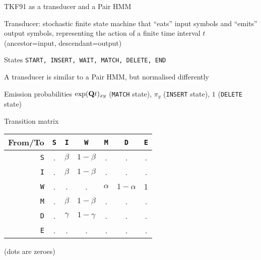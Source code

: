 \documentclass{beamer}
\begin{document}
\begin{frame}{}
TKF91 as a transducer and a Pair HMM
 \itemb
 \item Transducer: stochastic finite state machine that ``eats'' input symbols and ``emits'' output symbols,
representing the action of a finite time interval $t$ (ancestor=input, descendant=output)
  \itemb
  \item States {\tt START, INSERT, WAIT, MATCH, DELETE, END}
  \item A transducer is similar to a Pair HMM, but normalised differently
  \item Emission probabilities $\exp({\bf Q}t)_{xy}$ ({\tt MATCH} state), $\pi_y$ ({\tt INSERT} state), $1$ ({\tt DELETE} state)
  \item Transition matrix
\begin{tabular}{r|cccccc}
From/To & {\tt S} & {\tt I} & {\tt W} & {\tt M} & {\tt D} & {\tt E} \\
\hline
{\tt S} & . & $\beta$ & $1-\beta$ & . & . & . \\
{\tt I} & . & $\beta$ & $1-\beta$ & . & . & . \\
{\tt W} & . & . & . & $\alpha$ & $1-\alpha$ & 1 \\
{\tt M} & . & $\beta$ & $1-\beta$ & . & . & . \\
{\tt D} & . & $\gamma$ & $1-\gamma$ & . & . & . \\
{\tt E} & . & . & . & . & . & .
\end{tabular}
(dots are zeroes)
  \iteme
 \iteme
\end{frame}
\end{document}
